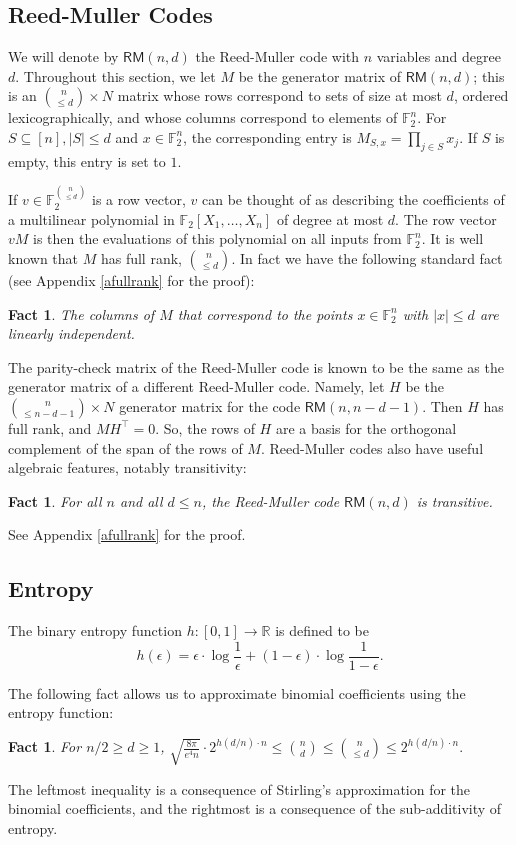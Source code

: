 \documentclass[12pt]{article}
\newtheorem{fact}[theorem]{Fact}
\newcommand{\R}{\mathbb{R}}
\newcommand{\F}{\mathbb{F}}
\begin{document}
\subsection{Reed-Muller Codes} 
We will denote by $\mathsf{RM}(n,d)$ the  Reed-Muller code with $n$ variables and degree $d$. Throughout this section, we let $M$ be the generator matrix of $\mathsf{RM}(n,d)$; this is an $ \binom{n}{\leq d}\times N$ matrix whose rows correspond to sets of size at most $d$, ordered lexicographically, and whose columns correspond to elements of $\F_2^n$. For $S \subseteq [n], |S| \leq d$ and $x \in \F_2^n$, the corresponding entry is $M_{S,x}=\prod_{j \in S} x_j$. If $S$ is empty, this entry is set to $1$.

If $v \in \F_2^{\binom{n}{\leq d}}$ is a row vector, $v$ can be thought of as describing the coefficients of a multilinear polynomial in $\F_2[X_1, \dotsc, X_n]$ of degree at most $d$. The row vector $vM$ is then the evaluations of this polynomial on all inputs from $\F_2^n$. 
It is well known that $M$ has full rank, $\binom{n}{\leq d}$. In fact we have the following standard fact (see Appendix \ref{afullrank} for the proof):
\begin{fact}\label{fullrank} The columns of $M$ that correspond to the points $x \in \F_2^n$ with $|x| \leq d$ are linearly independent.
\end{fact}
The parity-check matrix of the Reed-Muller code is known to be the same as the generator matrix of a different Reed-Muller code. Namely, let $H$ be the $ \binom{n}{\leq n-d-1}\times N$ generator matrix for the code $\mathsf{RM}(n,n-d-1)$. Then $H$ has full rank, and $M H^\intercal  = 0$. So, the rows of $H$ are a basis for the orthogonal complement of the span of the rows of $M$. 
Reed-Muller codes also have useful algebraic features, notably transitivity:
\begin{fact}\label{transitive}
For all $n$ and all $d\leq n$, the Reed-Muller code $\mathsf{RM}(n,d)$ is transitive.
\end{fact}
See Appendix \ref{afullrank} for the proof.

 \subsection{Entropy}
The binary entropy function $h:[0,1] \rightarrow \R$ is defined to be
$$h(\epsilon) = \epsilon \cdot \log\frac{1}{\epsilon} + (1-\epsilon) \cdot \log\frac{1}{1-\epsilon}.$$

The following fact allows us to approximate binomial coefficients using the entropy function:
\begin{fact} \label{stirling} For $n/2 \geq d \geq 1$,
$\sqrt{\frac{8\pi }{e^4 n}} \cdot 2^{h(d/n) \cdot n} \leq \binom{n}{d} \leq \binom{n}{\leq d} \leq 2^{h(d/n) \cdot n}.$
\end{fact}
The leftmost inequality is a consequence of Stirling's approximation for the binomial coefficients, and the rightmost is a consequence of the sub-additivity of entropy.
\end{document}

